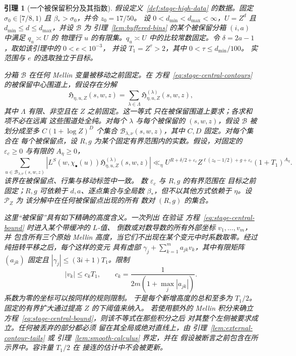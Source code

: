 \documentclass[11pt,a4paper]{article}
\numberwithin{equation}{section}
\numberwithin{figure}{section}
\newtheorem{lemma}[theorem]{引理}
\theoremstyle{definition}
\theoremstyle{remark}
\begin{document}
\begin{lemma}[一个被保留积分及其指数]
\label{lem:bin-contour-accounting}
假设定义~\ref{def:stage-high-data} 的数据。固定
$\sigma_0\in[7/8,1)$ 且 $\beta_*>\sigma_0$，并令 $z_0=17/50$。
设 $0<d_{\min}<d_{\max}<\infty$，$U=Z^d$ 且
$d_{\min}\le d\le d_{\max}$，并设 $\mathcal B$ 为
引理~\ref{lem:buffered-bins} 的某个被保留分箱 $(i,a)$ 中满足 $q_u\asymp U$ 的
物理行 $u$ 的有限集。$q_u\asymp U$
中的比较常数固定。令 $\delta=2a-1$，取如该引理中的 $0<e<10^{-3}$，
并设 $T_1=Z^\tau>2$，其中 $0<\tau\le d_{\min}/100$。
实范围与 $e$ 的选取独立于目标。

分箱 $\mathcal B$ 在任何 Mellin 变量被移动之前固定。在
方程~\eqref{eq:stage-central-contours} 的被保留中心围道上，假设存在分解
\[
 \mathfrak H_{\eta,u,Z}(s,w,z)
       =\sum_{\lambda\in\Lambda}
             \mathfrak H^{(\lambda)}_{\eta,u,Z}(s,w,z),
\]
其中 $\Lambda$ 有限、非空且在 $Z$ 之前固定。这一等式
只在被保留围道上要求；各求和项不必在远离
这些围道处全纯。对每个 $\lambda$ 与每个被保留的 $(s,w,z)$，假设
$\mathcal B$ 被划分成至多 $C(1+\log Z)^D$ 个集合
$\mathcal B_{\lambda,\nu}(s,w,z)$，其中 $C,D$ 固定。对每个集合在
每个被保留点，设 $R,g$ 为某个固定有界范围内的实数。假设，对固定的
$\varepsilon_c\ge0$ 与有限的 $A_\eta\ge0$，
\begin{equation}
 \sum_{u\in\mathcal B_{\lambda,\nu}(s,w,z)}
  \left|L^S(w,\chi_\bullet(u))
       \mathfrak H^{(\lambda)}_{\eta,u,Z}(s,w,z)\right|
 \ll_\eta U^{R+\delta/2+\varepsilon_c}
 Z^{\ell(z_0-1/2)+g+\varepsilon_c}(1+T_1)^{A_\eta}.
 \label{eq:stage-central-bound}
\end{equation}
该界在被保留点、行集与移动标签中一致。
数 $\varepsilon_c$ 与 $R,g$ 的有界范围在
目标之前固定；$R,g$ 可依赖于 $d,a$、逐点集合与全局数
$\beta_*$，但不以其他方式依赖于 $\eta$。设 $\mathcal P_Z$ 为
该分解中在任何被保留点出现的所有
数对 $(R,g)$ 的集合。

这里“被保留”具有如下精确的高度含义。一次列出
在验证
方程~\eqref{eq:stage-central-bound} 时进入某个带缓冲的 $L$-值、
倒数或对数导数的所有外部坐标 $v_1,\ldots,v_m$，并
包含所有三个原始
Mellin 高度，当它们不出现在某个变元中时系数取零。经过
纯扭转平移之后，每个这样的变元
具有虚部
$\gamma_j+\sum_{k=1}^m a_{jk}v_k$，其中有限矩阵 $(a_{jk})$
固定且 $|\gamma_j|\le(3i+1)T_1$。限制
\begin{equation}
 |v_k|\le c_kT_1,\qquad
 c_k=\frac1{2m(1+\max_j|a_{jk}|)}.
 \label{eq:stage-height-allocation}
\end{equation}
系数为零的坐标可以按同样的规则限制。
于是每个新增高度的总和至多为 $T_1/2$。
固定的有界扩大通过提高 $Z$ 的下阈值来纳入。
若使用额外的 Mellin 积分来确立
方程~\eqref{eq:stage-central-bound}，则该不等式在那些积分之后
对其整个左侧被要求成立。任何被丢弃的部分都必须
留在其全局或绝对直线上，由
引理~\ref{lem:external-contour-tails} 或
引理~\ref{lem:smooth-calculus} 界定，并在
假设被断言之前包含在所示界中。容许量 $T_1/2$ 在
接连的估计中不会被更新。


\end{lemma}
\end{document}
